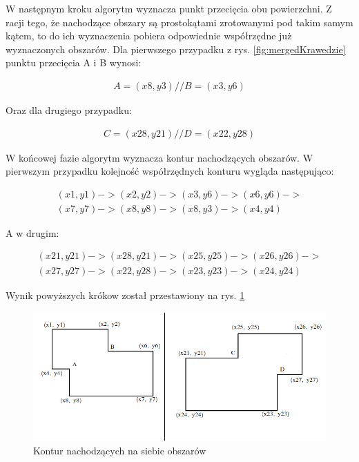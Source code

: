 W następnym kroku algorytm wyznacza punkt przecięcia obu powierzchni. Z racji tego, że nachodzące obszary są prostokątami zrotowanymi pod takim samym kątem, to do ich wyznaczenia pobiera odpowiednie współrzędne już wyznaczonych obszarów. Dla pierwszego przypadku z rys. \ref{fig:mergedKrawedzie} punktu przecięcia A i B wynosi:

\begin{equation}
\begin{split}
A = (x8, y3) //
B = (x3, y6)
\end{split}
\end{equation}

Oraz dla drugiego przypadku:

\begin{equation}
\begin{split}
C = (x28, y21) //
D = (x22, y28)
\end{split}
\end{equation}

W końcowej fazie algorytm wyznacza kontur nachodzących obszarów. W pierwszym przypadku kolejność współrzędnych konturu wygląda następująco:
 
\begin{equation}
\begin{split}
(x1, y1) -> (x2, y2) -> (x3, y6) -> (x6, y6) ->  \\
(x7, y7) -> (x8, y8) -> (x8, y3) -> (x4, y4)
\end{split}
\end{equation}

A w drugim: 

\begin{equation}
\begin{split}
(x21, y21) -> (x28, y21) -> (x25, y25) -> (x26, y26) ->  \\
(x27, y27) -> (x22, y28) -> (x23, y23) -> (x24, y24)
\end{split}
\end{equation}

Wynik powyższych krókow został przestawiony na rys. \ref{fig:mergedKrawedzieKontur}

\begin{figure}[h]
\caption{Kontur nachodzących na siebie obszarów}
\label{fig:mergedKrawedzieKontur}
\centering
\includegraphics[width=1.1\textwidth]{mergedKrawedzieKontur}
\end{figure}

